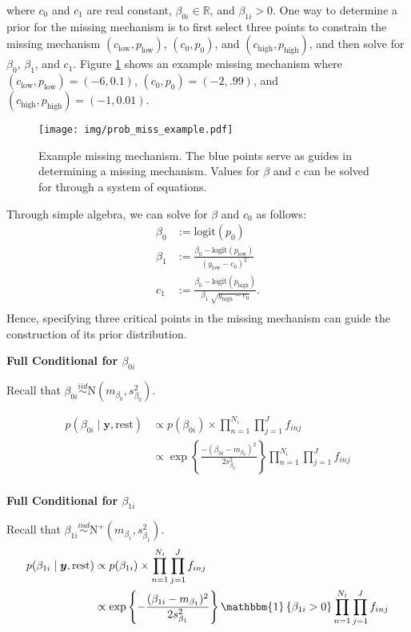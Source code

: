 \documentclass[12pt,]{article}
\newcommand{\bc}[1]{ \left\{#1\right\} }
\newcommand{\N}{ \mathcal{N} }
\def\beginmyfig{\begin{figure}[H]\center}
\def\endmyfig{\end{figure}}
\newcommand{\iid}{\overset{iid}{\sim}}
\newcommand{\ind}{\overset{ind}{\sim}}
\def\logit{\text{logit}}
\def\N{\text{N}}
\def\y{\bm{y}}
\newcommand{\Ind}[1]{\mathbbm{1}\bc{#1}}
\def\rest{\text{rest}}
\def\beginmyfig{\begin{figure}[H]\center}
\def\endmyfig{\end{figure}}
\begin{document}
where \(c_0\) and \(c_1\) are real constant, $\beta_{0i} \in \mathbb{R}$, and
$\beta_{1i} > 0$.
One way to determine a prior for the missing mechanism is to first select three
points to constrain the missing mechanism $(c_\text{low}, p_\text{low})$,
$(c_0, p_0)$, and $(c_\text{high}, p_\text{high})$, and then 
solve for $\beta_0$, $\beta_1$, and $c_1$. Figure \ref{fig:prob-miss-eg} shows
an example missing mechanism where $(c_\text{low}, p_\text{low}) = (-6,0.1)$,
$(c_0, p_0)=(-2,.99)$, and $(c_\text{high}, p_\text{high}) = (-1,0.01)$.
\beginmyfig
\texttt{[image: img/prob\_miss\_example.pdf]}
\caption{Example missing mechanism. The blue points serve as guides in
determining a missing mechanism. Values for $\beta$ and $c$ can be solved for
through a system of equations.}
\label{fig:prob-miss-eg}
\endmyfig

Through simple algebra, we can solve for $\beta$ and $c_0$ as follows:
\begin{align*}
  \beta_0 &:= \logit(p_0) \\
  \beta_1 &:= \frac{\beta_0 - \logit(p_\text{low})}{(y_\text{low} - c_0)^2} \\
  c_1 &:= \frac{\beta_0 - \logit(p_\text{high})}{\beta_1 ~ \sqrt{y_\text{high} - c_0} }. \\
\end{align*}
Hence, specifying three critical points in the missing mechanism can guide
the construction of its prior distribution.
\vspace{2em}


\textbf{Full Conditional for $\beta_{0i}$}

Recall that \(\beta_{0i} \iid \N(m_{\beta_0},s^2_{\beta_0})\).

\begin{align*}
p(\beta_{0i} \mid \y, \rest) &\propto
p(\beta_{0i}) \times \prod_{n=1}^{N_i} \prod_{j=1}^J f_{inj} \\
%
&\propto \exp\bc{\frac{-(\beta_{0i}-m_{\beta_0})^2}{2s^2_{\beta_0}}} \prod_{n=1}^{N_i} \prod_{j=1}^J f_{inj} \\
\end{align*}

\vspace{2em}


\textbf{Full Conditional for $\beta_{1i}$}

Recall that $\beta_{1i}\ind \N^+(m_{\beta_1}, s^2_{\beta_1})$.
%
\begin{align*}
p(\beta_{1i} \mid \y, \rest) &\propto
p(\beta_{1i}) \times 
\prod_{n=1}^{N_i} \prod_{j=1}^J f_{inj} \\
%
&\propto \exp\bc{-\frac{(\beta_{1i} - m_{\beta_1})^2}{2s^2_{\beta_1}}}
\Ind{\beta_{1i} > 0}
\prod_{n=1}^{N_i} \prod_{j=1}^J f_{inj} \\
\end{align*}
\end{document}
